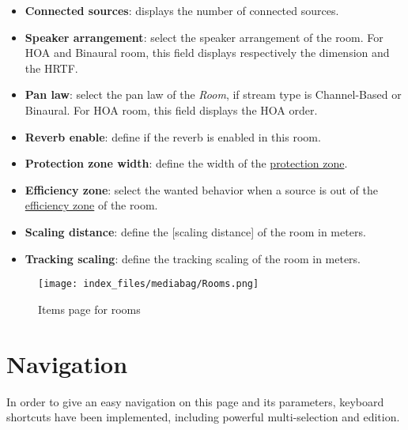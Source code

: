 \documentclass[
  letterpaper,
  DIV=11,
  numbers=noendperiod]{scrreport}
\providecommand{\tightlist}{%
  \setlength{\itemsep}{0pt}\setlength{\parskip}{0pt}}\usepackage{longtable,booktabs,array}
\begin{document}
\begin{itemize}
\tightlist
\item
  \textbf{Connected sources}: displays the number of connected sources.
\item
  \textbf{Speaker arrangement}: select the speaker arrangement of the
  room. For HOA and Binaural room, this field displays respectively the
  dimension and the HRTF.
\item
  \textbf{Pan law}: select the pan law of the \emph{Room}, if stream
  type is Channel-Based or Binaural. For HOA room, this field displays
  the HOA order.
\item
  \textbf{Reverb enable}: define if the reverb is enabled in this room.
\item
  \textbf{Protection zone width}: define the width of the
  \href{/Spat_Environment_Understanding_the_3D_View?id=the-protection-zone}{protection
  zone}.
\item
  \textbf{Efficiency zone}: select the wanted behavior when a source is
  out of the
  \href{/Spat_Environment_Understanding_the_3D_View?id=the-efficiency-zone}{efficiency
  zone} of the room.
\item
  \textbf{Scaling distance}: define the {[}scaling distance{]} of the
  room in meters.
\item
  \textbf{Tracking scaling}: define the tracking scaling of the room in
  meters.
\end{itemize}

\begin{figure}

{\centering \texttt{[image: index\_files/mediabag/Rooms.png]}

}

\caption{Items page for rooms}

\end{figure}

\hypertarget{navigation}{%
\section{Navigation}\label{navigation}}

In order to give an easy navigation on this page and its parameters,
keyboard shortcuts have been implemented, including powerful
multi-selection and edition.
\end{document}
